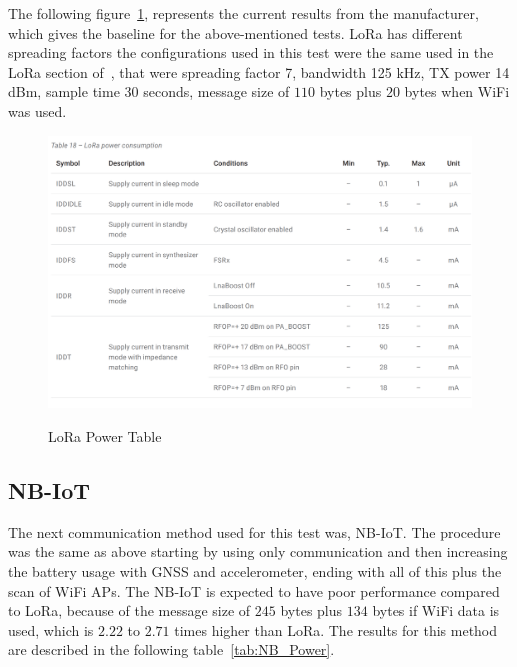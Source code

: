 The following figure~\ref{fig:LoRaPowerTable}, represents the current results from the manufacturer, which gives the baseline for the above-mentioned tests. LoRa has different spreading factors the configurations used in this test were the same used in the LoRa section of~, that were spreading factor 7, bandwidth 125 kHz, TX power 14 dBm, sample time 30 seconds, message size of $110$ bytes plus $20$ bytes when WiFi was used.

\begin{figure}[htbp]
  \centering
  
    {\includegraphics[width=0.91\linewidth]{Chapters/Figures/Lora2.PNG}}%
 
  \caption{LoRa Power Table~\cite{Microcontroller2017}}
  \label{fig:LoRaPowerTable}
\end{figure}

\subsection{NB-IoT}
\label{subsec:NB} 

The next communication method used for this test was, NB-IoT. The procedure was the same as above starting by using only communication and then increasing the battery usage with GNSS and accelerometer, ending with all of this plus the scan of WiFi APs. The NB-IoT is expected to have poor performance compared to LoRa, because of the message size of $245$ bytes plus $134$ bytes if WiFi data is used, which is $2.22$ to $2.71$ times higher than LoRa. The results for this method are described in the following table~\ref{tab:NB_Power}.

